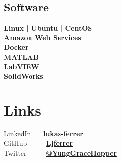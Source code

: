 \documentclass[letterpaper]{deedy-resume} %
\begin{document}
\begin{minipage}[t]{0.33\textwidth}
\subsection{Software}
{\bf Linux | Ubuntu | CentOS} \\
{\bf Amazon Web Services} \\
{\bf Docker} \\
{\bf MATLAB} \\
{\bf LabVIEW} \\
{\bf SolidWorks} \\

\sectionspace %


\section{Links} 
\location{}     %
{LinkedIn \ \ \ \href{https://www.linkedin.com/in/lukas-ferrer-9596a410b}{\bf lukas-ferrer}} \\
{GitHub \ \ \ \ \  \href{https://github.com/Ljferrer}{\bf Ljferrer}} \\
{Twitter \ \ \ \ \ \href{https://twitter.com/YungGraceHopper}{\bf @YungGraceHopper}}

\sectionspace %


\end{minipage} %
\hfill
%
%
\end{document}
